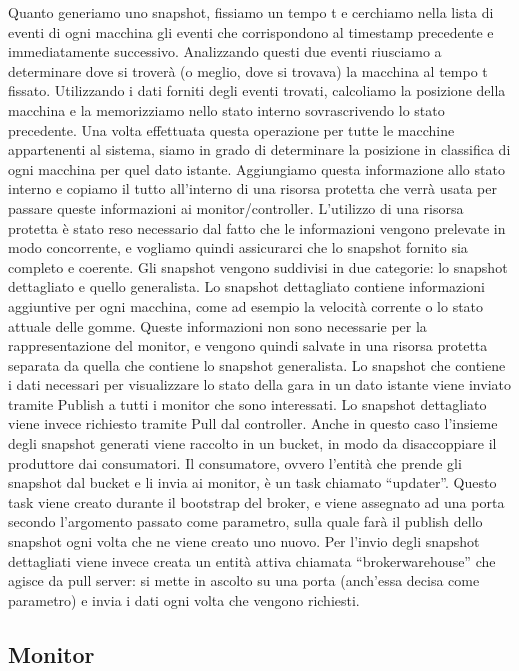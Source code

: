 Quanto generiamo uno snapshot, fissiamo un tempo t e cerchiamo nella lista di eventi di ogni macchina gli eventi che corrispondono al timestamp precedente e immediatamente successivo.
Analizzando questi due eventi riusciamo a determinare dove si troverà (o meglio, dove si trovava) la macchina al tempo t fissato. Utilizzando i dati forniti degli eventi trovati, calcoliamo la posizione della macchina e la memorizziamo nello stato interno sovrascrivendo lo stato precedente. Una volta effettuata questa operazione per tutte le macchine appartenenti al sistema, siamo in grado di determinare la posizione in classifica di ogni macchina per quel dato istante. Aggiungiamo questa informazione allo stato interno e copiamo il tutto all’interno di una risorsa protetta che verrà usata per passare queste informazioni ai monitor/controller. L’utilizzo di una risorsa protetta è stato reso necessario dal fatto che le informazioni vengono prelevate in modo concorrente, e vogliamo quindi assicurarci che lo snapshot fornito sia completo e coerente.
Gli snapshot vengono suddivisi in due categorie: lo snapshot dettagliato e quello generalista. Lo snapshot dettagliato contiene informazioni aggiuntive per ogni macchina, come ad esempio la velocità corrente o lo stato attuale delle gomme. Queste informazioni non sono necessarie per la rappresentazione del monitor, e vengono quindi salvate in una risorsa protetta separata da quella che contiene lo snapshot generalista.
Lo snapshot che contiene i dati necessari per visualizzare lo stato della gara in un dato istante viene inviato tramite Publish a tutti  i monitor che sono interessati. Lo snapshot dettagliato viene invece richiesto tramite Pull dal controller.
Anche in questo caso l’insieme degli snapshot generati viene raccolto in un bucket, in modo da disaccoppiare il produttore dai consumatori. 
Il consumatore, ovvero l’entità che prende gli snapshot dal bucket e li invia ai monitor, è un task chiamato “updater”. Questo task viene creato durante il bootstrap del broker, e viene assegnato ad una porta secondo l’argomento passato come parametro, sulla quale farà il publish dello snapshot ogni volta che ne viene creato uno nuovo.
Per l’invio degli snapshot dettagliati viene invece creata un entità attiva chiamata “broker\textunderscore warehouse” che agisce da pull server: si mette in ascolto su una porta (anch’essa decisa come parametro) e invia i dati ogni volta che vengono richiesti.

\subsection{Monitor}

